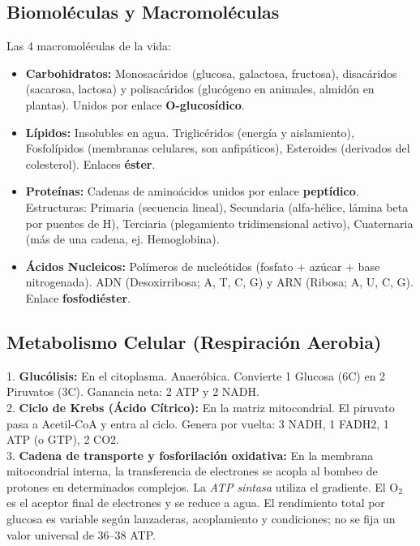 \subsection{Biomoléculas y Macromoléculas}
Las 4 macromoléculas de la vida:
\begin{itemize}
    \item \textbf{Carbohidratos:} Monosacáridos (glucosa, galactosa, fructosa), disacáridos (sacarosa, lactosa) y polisacáridos (glucógeno en animales, almidón en plantas). Unidos por enlace \textbf{O-glucosídico}.
    \item \textbf{Lípidos:} Insolubles en agua. Triglicéridos (energía y aislamiento), Fosfolípidos (membranas celulares, son anfipáticos), Esteroides (derivados del colesterol). Enlaces \textbf{éster}.
    \item \textbf{Proteínas:} Cadenas de aminoácidos unidos por enlace \textbf{peptídico}. Estructuras: Primaria (secuencia lineal), Secundaria (alfa-hélice, lámina beta por puentes de H), Terciaria (plegamiento tridimensional activo), Cuaternaria (más de una cadena, ej. Hemoglobina).
    \item \textbf{Ácidos Nucleicos:} Polímeros de nucleótidos (fosfato + azúcar + base nitrogenada). ADN (Desoxirribosa; A, T, C, G) y ARN (Ribosa; A, U, C, G). Enlace \textbf{fosfodiéster}.
\end{itemize}

\subsection{Metabolismo Celular (Respiración Aerobia)}
\begin{tcolorbox}[colback=green!5!white,colframe=green!50!black,title=Las 3 etapas de la Respiración Celular Aerobia]
1. \textbf{Glucólisis:} En el citoplasma. Anaeróbica. Convierte 1 Glucosa (6C) en 2 Piruvatos (3C). Ganancia neta: 2 ATP y 2 NADH.\\
2. \textbf{Ciclo de Krebs (Ácido Cítrico):} En la matriz mitocondrial. El piruvato pasa a Acetil-CoA y entra al ciclo. Genera por vuelta: 3 NADH, 1 FADH2, 1 ATP (o GTP), 2 CO2.\\
3. \textbf{Cadena de transporte y fosforilación oxidativa:} En la membrana mitocondrial interna, la transferencia de electrones se acopla al bombeo de protones en determinados complejos. La \textit{ATP sintasa} utiliza el gradiente. El $\mathrm{O}_{2}$ es el aceptor final de electrones y se reduce a agua. El rendimiento total por glucosa es variable según lanzaderas, acoplamiento y condiciones; no se fija un valor universal de 36--38 ATP.
\end{tcolorbox}

